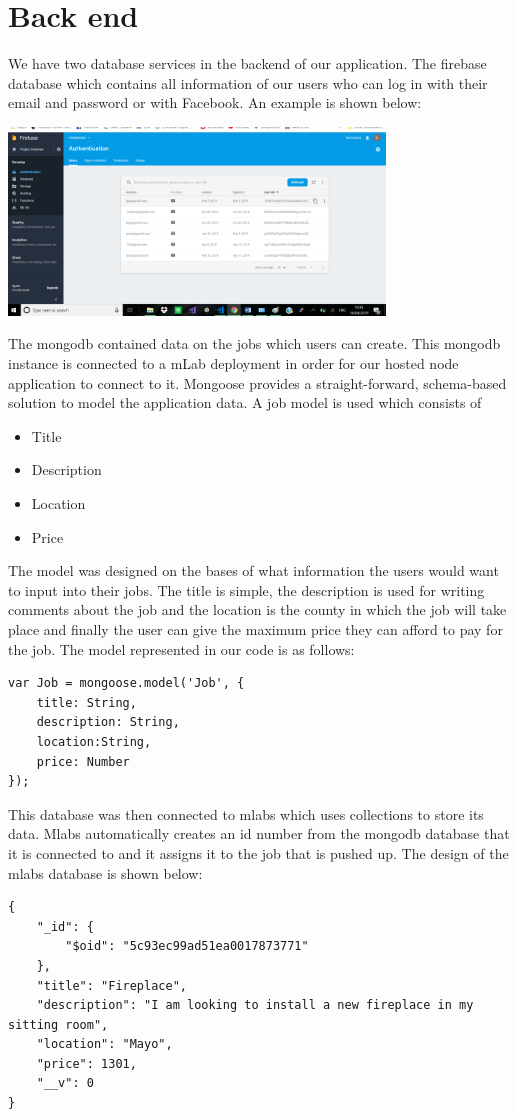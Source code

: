 \section{Back end}
We have two database services in the backend of our application. The firebase database which contains all information of our users who can log in with their email and password or with Facebook. An example is shown below:
\begin{center}    
	\includegraphics[width=10cm, height=5cm]{img/users.png}
\end{center}
The mongodb contained data on the jobs which users can create. This mongodb instance is connected to a mLab deployment in order for our hosted node application to connect to it. Mongoose provides a straight-forward, schema-based solution to model the application data. A job model is used which consists of 
\begin{itemize}
	\item Title
	\item Description
	\item Location
	\item Price
\end{itemize}
The model was designed on the bases of what information the  users would want to input into their jobs. The title is simple, the  description is used for writing comments about the job and the location is the county in which the job will take place and finally the user can give the maximum price they can afford to pay for the job.
The model represented in our code is as follows:
\begin{verbatim}
var Job = mongoose.model('Job', {
    title: String,
    description: String,
    location:String,
    price: Number
});
\end{verbatim}
This database was then connected to mlabs which uses collections to store its data. Mlabs automatically creates an id number from the mongodb database that it is connected to and it assigns it to the job that is pushed up. The design of the mlabs database is shown below: 
\begin{verbatim}
{
    "_id": {
        "$oid": "5c93ec99ad51ea0017873771"
    },
    "title": "Fireplace",
    "description": "I am looking to install a new fireplace in my sitting room",
    "location": "Mayo",
    "price": 1301,
    "__v": 0
}
\end{verbatim}

